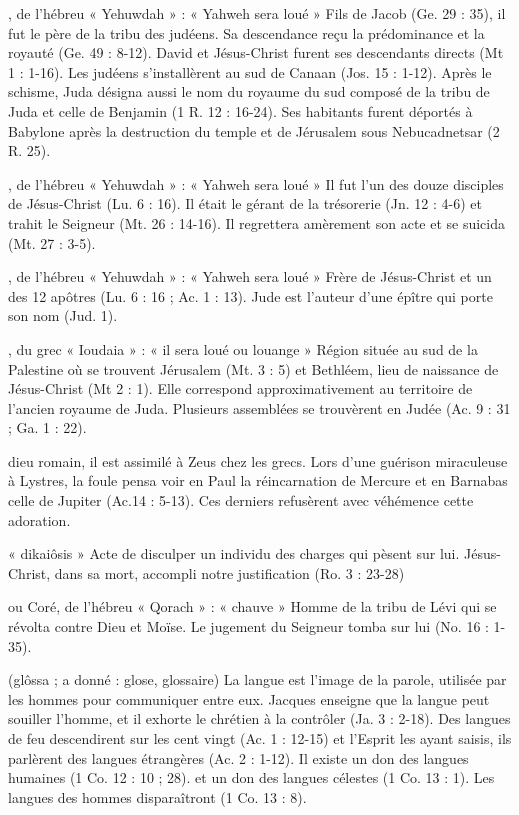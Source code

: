 \begin{multicols}{2}
, de l'hébreu « Yehuwdah » : « Yahweh sera loué »
Fils de Jacob (Ge. 29 : 35), il fut le père de la tribu des judéens. Sa descendance reçu la prédominance et la royauté (Ge. 49 : 8-12). David et Jésus-Christ furent ses descendants directs (Mt 1 : 1-16). Les judéens s'installèrent au sud de Canaan (Jos. 15 : 1-12). Après le schisme, Juda désigna aussi le nom du royaume du sud composé de la tribu de Juda et celle de Benjamin (1 R. 12 : 16-24). Ses habitants furent déportés à Babylone après la destruction du temple et de Jérusalem sous Nebucadnetsar (2 R. 25).


, de l'hébreu « Yehuwdah » : « Yahweh sera loué »
Il fut l'un des douze disciples de Jésus-Christ (Lu. 6 : 16). Il était le gérant de la trésorerie (Jn. 12 : 4-6) et trahit le Seigneur (Mt. 26 : 14-16). Il regrettera amèrement son acte et se suicida (Mt. 27 : 3-5).


, de l'hébreu « Yehuwdah » : « Yahweh sera loué »
Frère de Jésus-Christ et un des 12 apôtres (Lu. 6 : 16 ; Ac. 1 : 13). Jude est l'auteur d'une épître qui porte son nom (Jud. 1).


, du grec « Ioudaia » : « il sera loué ou louange »
Région située au sud de la Palestine où se trouvent Jérusalem (Mt. 3 : 5) et Bethléem, lieu de naissance de Jésus-Christ (Mt 2 : 1). Elle correspond approximativement au territoire de l'ancien royaume de Juda. Plusieurs assemblées se trouvèrent en Judée (Ac. 9 : 31 ; Ga. 1 : 22).


dieu romain, il est assimilé à Zeus chez les grecs. Lors d'une guérison miraculeuse à Lystres, la foule pensa voir en Paul la réincarnation de Mercure et en Barnabas celle de Jupiter (Ac.14 : 5-13). Ces derniers refusèrent avec véhémence cette adoration.


« dikaiôsis »
Acte de disculper un individu des charges qui pèsent sur lui. Jésus-Christ, dans sa mort, accompli notre justification (Ro. 3 : 23-28)


ou Coré, de l'hébreu « Qorach » : « chauve »
Homme de la tribu de Lévi qui se révolta contre Dieu et Moïse. Le jugement du Seigneur tomba sur lui (No. 16 : 1-35).


(glôssa ; a donné : glose, glossaire)
La langue est l'image de la parole, utilisée par les hommes pour communiquer entre eux. Jacques enseigne que la langue peut souiller l'homme, et il exhorte le chrétien à la contrôler (Ja. 3 : 2-18). Des langues de feu descendirent sur les cent vingt (Ac. 1 : 12-15) et l’Esprit les ayant saisis, ils parlèrent des langues étrangères (Ac. 2 : 1-12). Il existe un don des langues humaines (1 Co. 12 : 10 ; 28). et un don des langues célestes (1 Co. 13 : 1). Les langues des hommes disparaîtront (1 Co. 13 : 8).



\end{multicols}
